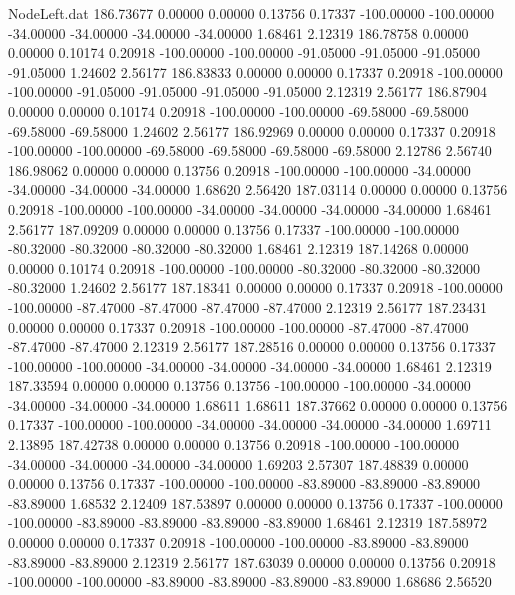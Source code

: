 \begin{filecontents}{NodeLeft.dat}
 186.73677    0.00000    0.00000     0.13756    0.17337 -100.00000 -100.00000  -34.00000  -34.00000  -34.00000  -34.00000    1.68461    2.12319
 186.78758    0.00000    0.00000     0.10174    0.20918 -100.00000 -100.00000  -91.05000  -91.05000  -91.05000  -91.05000    1.24602    2.56177
 186.83833    0.00000    0.00000     0.17337    0.20918 -100.00000 -100.00000  -91.05000  -91.05000  -91.05000  -91.05000    2.12319    2.56177
 186.87904    0.00000    0.00000     0.10174    0.20918 -100.00000 -100.00000  -69.58000  -69.58000  -69.58000  -69.58000    1.24602    2.56177
 186.92969    0.00000    0.00000     0.17337    0.20918 -100.00000 -100.00000  -69.58000  -69.58000  -69.58000  -69.58000    2.12786    2.56740
 186.98062    0.00000    0.00000     0.13756    0.20918 -100.00000 -100.00000  -34.00000  -34.00000  -34.00000  -34.00000    1.68620    2.56420
 187.03114    0.00000    0.00000     0.13756    0.20918 -100.00000 -100.00000  -34.00000  -34.00000  -34.00000  -34.00000    1.68461    2.56177
 187.09209    0.00000    0.00000     0.13756    0.17337 -100.00000 -100.00000  -80.32000  -80.32000  -80.32000  -80.32000    1.68461    2.12319
 187.14268    0.00000    0.00000     0.10174    0.20918 -100.00000 -100.00000  -80.32000  -80.32000  -80.32000  -80.32000    1.24602    2.56177
 187.18341    0.00000    0.00000     0.17337    0.20918 -100.00000 -100.00000  -87.47000  -87.47000  -87.47000  -87.47000    2.12319    2.56177
 187.23431    0.00000    0.00000     0.17337    0.20918 -100.00000 -100.00000  -87.47000  -87.47000  -87.47000  -87.47000    2.12319    2.56177
 187.28516    0.00000    0.00000     0.13756    0.17337 -100.00000 -100.00000  -34.00000  -34.00000  -34.00000  -34.00000    1.68461    2.12319
 187.33594    0.00000    0.00000     0.13756    0.13756 -100.00000 -100.00000  -34.00000  -34.00000  -34.00000  -34.00000    1.68611    1.68611
 187.37662    0.00000    0.00000     0.13756    0.17337 -100.00000 -100.00000  -34.00000  -34.00000  -34.00000  -34.00000    1.69711    2.13895
 187.42738    0.00000    0.00000     0.13756    0.20918 -100.00000 -100.00000  -34.00000  -34.00000  -34.00000  -34.00000    1.69203    2.57307
 187.48839    0.00000    0.00000     0.13756    0.17337 -100.00000 -100.00000  -83.89000  -83.89000  -83.89000  -83.89000    1.68532    2.12409
 187.53897    0.00000    0.00000     0.13756    0.17337 -100.00000 -100.00000  -83.89000  -83.89000  -83.89000  -83.89000    1.68461    2.12319
 187.58972    0.00000    0.00000     0.17337    0.20918 -100.00000 -100.00000  -83.89000  -83.89000  -83.89000  -83.89000    2.12319    2.56177
 187.63039    0.00000    0.00000     0.13756    0.20918 -100.00000 -100.00000  -83.89000  -83.89000  -83.89000  -83.89000    1.68686    2.56520

\end{filecontents}
